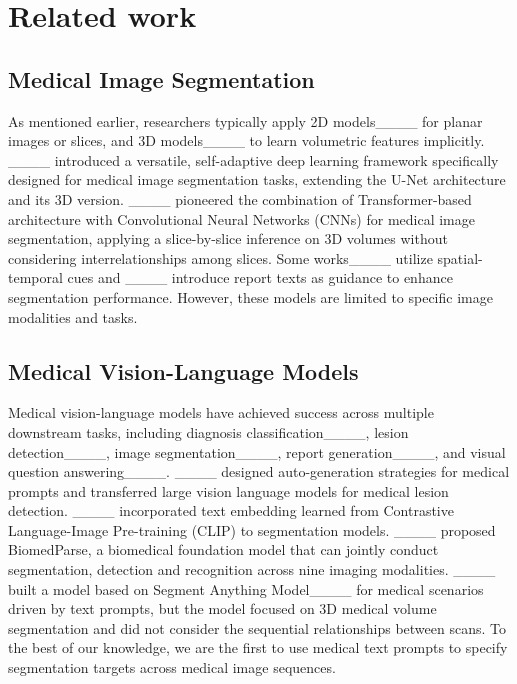 \section{Related work}
\label{RL}

\subsection{Medical Image Segmentation} 
As mentioned earlier, researchers typically apply 2D models____ for planar images or slices, and 3D models____ to learn volumetric features implicitly.
____ introduced a versatile, self-adaptive deep learning framework specifically designed for medical image segmentation tasks, extending the U-Net architecture and its 3D version. 
____ pioneered the combination of Transformer-based architecture with Convolutional Neural Networks (CNNs) for medical image segmentation, applying a slice-by-slice inference on 3D volumes without considering interrelationships among slices. 
Some works____ utilize spatial-temporal cues and ____ introduce report texts as guidance to enhance segmentation performance. However, these models are limited to specific image modalities and tasks.  

\subsection{Medical Vision-Language Models} Medical vision-language models have achieved success across multiple downstream tasks, including diagnosis classification____, lesion detection____, image segmentation____, report generation____, and visual question answering____. 
____ designed auto-generation strategies for medical prompts and transferred large vision language models for medical lesion detection. 
____ incorporated text embedding learned from Contrastive Language-Image Pre-training (CLIP) to segmentation models.
____ proposed BiomedParse, a biomedical foundation model that can jointly conduct segmentation, detection and recognition across nine imaging modalities.
____ built a model based on Segment Anything Model____ for medical scenarios driven by text prompts, but the model focused on 3D medical volume segmentation and did not consider the sequential relationships between scans. 
To the best of our knowledge, we are the first to use medical text prompts to specify segmentation targets across medical image sequences.

